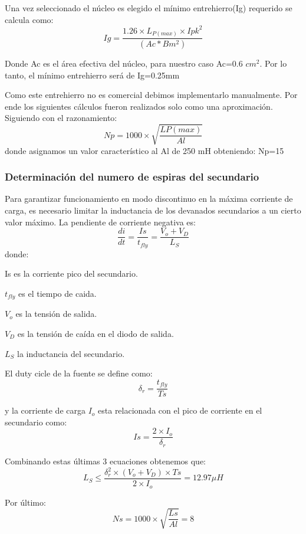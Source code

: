 Una vez seleccionado el núcleo es elegido el mínimo entrehierro(Ig) requerido se calcula como:
$$
Ig= \frac{1.26 \times L_{P(max)} \times Ipk^2}{(Ac*Bm^2)}
$$

Donde Ac es el área efectiva del núcleo, para nuestro caso Ac=0.6 $cm^2$. Por lo tanto, el mínimo entrehierro será de Ig=0.25mm

Como este entrehierro no es comercial debimos implementarlo manualmente. Por ende los siguientes cálculos fueron realizados solo como una aproximación.
Siguiendo con el razonamiento:
$$
Np= 1000 \times \sqrt{\frac{L{P(max)}}{Al}}
$$
donde asignamos un valor característico al Al de 250 mH obteniendo: Np=15
\medskip
\subsubsection{Determinación del numero de espiras del secundario}

Para garantizar funcionamiento en modo discontinuo en la máxima corriente de carga, es necesario limitar la inductancia de los devanados secundarios a un cierto valor máximo. La pendiente de corriente negativa es:
$$
\frac{di}{dt}= \frac{Is}{t_{fly}} = \frac{V_o+V_D}{L_S}
$$
donde:
\begin{list}{ }
\item  Is es la corriente pico del secundario.
\item $t_{fly}$ es el tiempo de caida. 
\item $V_o$ es la tensión de salida. 
\item $V_D$ es la tensión de caída en el diodo de salida.
\item $L_S$ la inductancia del secundario.
\item
\end{list}

El duty cicle de la fuente se define como:
$$
\delta_r= \frac{t_{fly}}{Ts}
$$

y la corriente de carga $I_o$ esta relacionada con el pico de corriente en el secundario
como:
$$
Is=\frac{2 \times I_o }{\delta_r}
$$

Combinando estas últimas 3 ecuaciones obtenemos que:
$$
L_S \leq \frac{\delta_r^2 \times (V_o + V_D) \times Ts}{2 \times I_o} =12.97\mu H
$$

Por último:
$$
Ns= 1000 \times \sqrt{\frac{Ls}{Al}}=8
$$
\medskip
